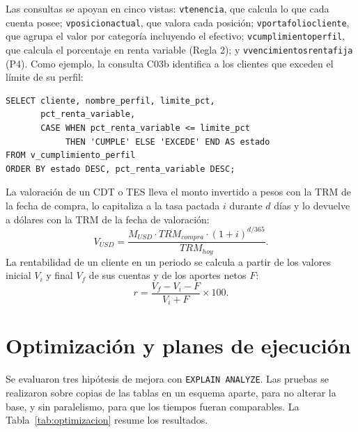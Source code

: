 \documentclass[10pt,letterpaper]{article}
\renewcommand{\_}{\oldUS\allowbreak}
\begin{document}
Las consultas se apoyan en cinco vistas: \texttt{v\_tenencia}, que calcula lo que cada cuenta posee; \texttt{v\_posicion\_actual}, que valora cada posición; \texttt{v\_portafolio\_cliente}, que agrupa el valor por categoría incluyendo el efectivo; \texttt{v\_cumplimiento\_perfil}, que calcula el porcentaje en renta variable (Regla 2); y \texttt{v\_vencimientos\_renta\_fija} (P4). Como ejemplo, la consulta C03b identifica a los clientes que exceden el límite de su perfil:

\begin{lstlisting}
SELECT cliente, nombre_perfil, limite_pct,
       pct_renta_variable,
       CASE WHEN pct_renta_variable <= limite_pct
            THEN 'CUMPLE' ELSE 'EXCEDE' END AS estado
FROM v_cumplimiento_perfil
ORDER BY estado DESC, pct_renta_variable DESC;
\end{lstlisting}

La valoración de un CDT o TES lleva el monto invertido a pesos con la TRM de la fecha de compra, lo capitaliza a la tasa pactada $i$ durante $d$ días y lo devuelve a dólares con la TRM de la fecha de valoración:
\begin{equation}
V_{USD} = \frac{M_{USD}\cdot TRM_{compra}\cdot(1+i)^{d/365}}{TRM_{hoy}}.
\end{equation}
La rentabilidad de un cliente en un periodo se calcula a partir de los valores inicial $V_i$ y final $V_f$ de sus cuentas y de los aportes netos $F$:
\begin{equation}
r = \frac{V_f - V_i - F}{V_i + F}\times 100.
\end{equation}

\section{Optimización y planes de ejecución}

Se evaluaron tres hipótesis de mejora con \texttt{EXPLAIN ANALYZE}. Las pruebas se realizaron sobre copias de las tablas en un esquema aparte, para no alterar la base, y sin paralelismo, para que los tiempos fueran comparables. La Tabla~\ref{tab:optimizacion} resume los resultados.
\end{document}
